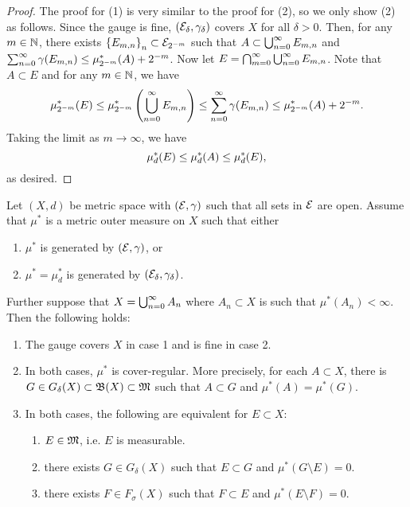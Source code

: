 \documentclass[a4paper]{article}
\begin{document}
\begin{proof}
The proof for (1) is very similar to the proof for (2), 
so we only show (2) as follows.
Since the gauge is fine, $(\mathcal{E}_\delta, \gamma_\delta)$
covers $X$ for all $\delta > 0$. Then, for any $m \in \mathbb{N}$,
there exists $\left\{ E_{m, n} \right\}_{n} \subset 
\mathcal{E}_{2^{-m}}$ such that $A \subset \bigcup_{n=0}^\infty E_{m, n}$ 
and $\sum_{n=0}^\infty \gamma(E_{m, n}) \leq \mu^*_{2^{-m}}(A) + 2^{-m}$. 
Now let $E = \bigcap_{m=0}^\infty \bigcup_{n=0}^\infty E_{m, n}$. Note that 
$A \subset E$ and for any $m \in \mathbb{N}$, we have 
\[
\mu^*_{2^{-m}} (E) \leq \mu^*_{2^{-m}} \left( \bigcup_{n=0}^\infty E_{m, n} \right) 
\leq \sum_{n=0}^\infty \gamma(E_{m, n}) \leq \mu^*_{2^{-m}} (A) + 2^{-m}.
\]
Taking the limit as $m \to \infty$, we have 
\[
\mu^*_d (E) \leq \mu^*_d(A) \leq \mu^*_d(E),
\]
as desired.

\end{proof}

\begin{thm}
  Let $(X, d)$ be metric space with $(\mathcal{E}, \gamma)$ such that
  all sets in $\mathcal{E}$ are open. Assume that $\mu^*$ is a metric 
  outer measure on $X$ such that either 
  
  \begin{enumerate}
    \item $\mu^*$ is generated by $(\mathcal{E}, \gamma)$, or 
    \item $\mu^* = \mu^*_d$ is generated by $(\mathcal{E}_\delta, 
    \gamma_\delta)$.
  \end{enumerate}

  Further suppose that $X = \bigcup_{n=0}^\infty A_n$ where $A_n \subset X$
  is such that $\mu^*(A_n) < \infty$. Then the following holds:

  \begin{enumerate}
    \item The gauge covers $X$ in case 1 and is fine in case 
    2. 
    \item In both cases, $\mu^*$ is cover-regular. More precisely,
    for each $A \subset X$, there is $G \in G_\delta(X) \subset \mathfrak{B}(X)
    \subset \mathfrak{M}$ such that $A \subset G$ and $\mu^*(A) = \mu^*(G)$.
    \item In both cases, the following are equivalent for 
    $E \subset X$: 
    \begin{enumerate}
      \item $E \in \mathfrak{M}$, i.e. $E$ is measurable.
      \item there exists $G \in G_\delta(X)$ such that 
      $E \subset G$ and $\mu^*(G \setminus E) = 0$.
      \item there exists $F \in F_\sigma(X)$ such that 
      $F \subset E$ and $\mu^* (E \setminus F) = 0$.
    \end{enumerate}
  \end{enumerate}
\end{thm}
\end{document}

